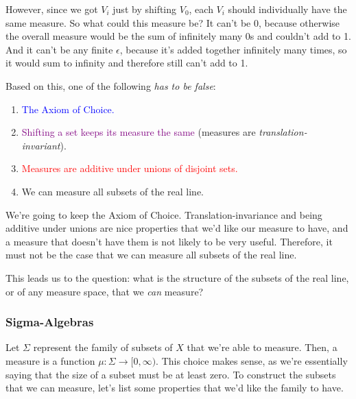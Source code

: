 \documentclass[../analysis.tex]{subfiles}
\begin{document}
    However, since we got $V_i$ just by shifting $V_0$, each $V_i$ should individually have the same measure. So what could this measure be? It can't be 0, because otherwise the overall measure would be the sum of infinitely many 0s and couldn't add to 1. And it can't be any finite $\epsilon$, because it's added together infinitely many times, so it would sum to infinity and therefore still can't add to 1. 

    Based on this, one of the following \emph{has to be false}:

    \begin{enumerate}
        \setlength\itemsep{1pt}
        \item \textcolor{blue}{The Axiom of Choice.}
        \item \textcolor{purple}{Shifting a set keeps its measure the same} (measures are \emph{translation-invariant}).
        \item \textcolor{red}{Measures are additive under unions of disjoint sets.}
        \item We can measure all subsets of the real line.
    \end{enumerate}

    We're going to keep the Axiom of Choice. Translation-invariance and being additive under unions are nice properties that we'd like our measure to have, and a measure that doesn't have them is not likely to be very useful. Therefore, it must not be the case that we can measure all subsets of the real line. 

    This leads us to the question: what is the structure of the subsets of the real line, or of any measure space, that we \emph{can} measure?

    \subsubsection{Sigma-Algebras}

    Let $\Sigma$ represent the family of subsets of $X$ that we're able to measure. Then, a measure is a function $\mu: \Sigma \to [0, \infty)$. This choice makes sense, as we're essentially saying that the size of a subset must be at least zero. To construct the subsets that we can measure, let's list some properties that we'd like the family to have. 
\end{document}
